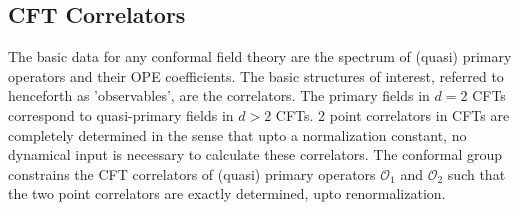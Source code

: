   \subsection{CFT Correlators}
  The basic data for any conformal field theory are the spectrum of (quasi) primary operators and their OPE coefficients. The basic structures of interest, referred to henceforth as 'observables', are the correlators. The primary fields in $d=2$ CFTs correspond to quasi-primary fields in $d > 2$ CFTs. 2 point correlators in CFTs are completely determined in the sense that upto a normalization constant, no dynamical input is necessary to calculate these correlators. The conformal group constrains the CFT correlators of (quasi) primary operators $\mathcal{O}_1$ and $\mathcal{O}_2$ such that the two point correlators are exactly determined, upto renormalization. 
  
